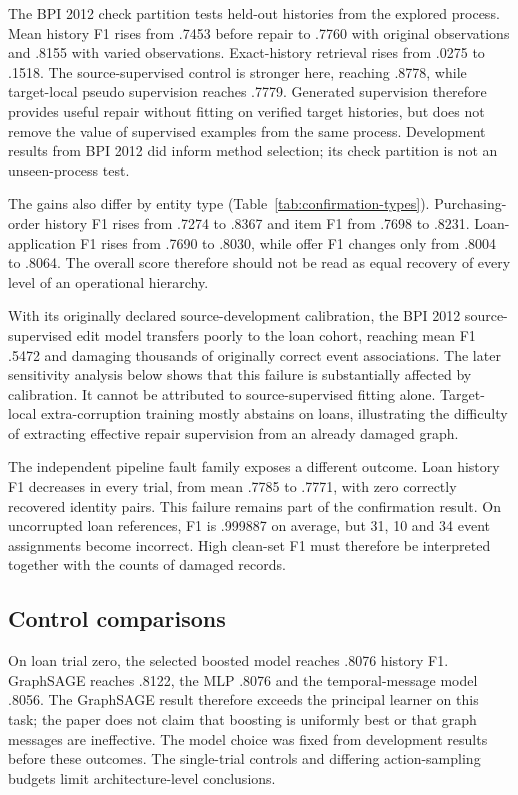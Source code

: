 \documentclass[11pt]{article}
\begin{document}
The BPI 2012 check partition tests held-out histories from the explored process. Mean history F1 rises from .7453 before repair to .7760 with original observations and .8155 with varied observations. Exact-history retrieval rises from .0275 to .1518. The source-supervised control is stronger here, reaching .8778, while target-local pseudo supervision reaches .7779. Generated supervision therefore provides useful repair without fitting on verified target histories, but does not remove the value of supervised examples from the same process. Development results from BPI 2012 did inform method selection; its check partition is not an unseen-process test.

The gains also differ by entity type (Table~\ref{tab:confirmation-types}). Purchasing-order history F1 rises from .7274 to .8367 and item F1 from .7698 to .8231. Loan-application F1 rises from .7690 to .8030, while offer F1 changes only from .8004 to .8064. The overall score therefore should not be read as equal recovery of every level of an operational hierarchy.

With its originally declared source-development calibration, the BPI 2012 source-supervised edit model transfers poorly to the loan cohort, reaching mean F1 .5472 and damaging thousands of originally correct event associations. The later sensitivity analysis below shows that this failure is substantially affected by calibration. It cannot be attributed to source-supervised fitting alone. Target-local extra-corruption training mostly abstains on loans, illustrating the difficulty of extracting effective repair supervision from an already damaged graph.

The independent pipeline fault family exposes a different outcome. Loan history F1 decreases in every trial, from mean .7785 to .7771, with zero correctly recovered identity pairs. This failure remains part of the confirmation result. On uncorrupted loan references, F1 is .999887 on average, but 31, 10 and 34 event assignments become incorrect. High clean-set F1 must therefore be interpreted together with the counts of damaged records.


\subsection{Control comparisons}

On loan trial zero, the selected boosted model reaches .8076 history F1. GraphSAGE reaches .8122, the MLP .8076 and the temporal-message model .8056. The GraphSAGE result therefore exceeds the principal learner on this task; the paper does not claim that boosting is uniformly best or that graph messages are ineffective. The model choice was fixed from development results before these outcomes. The single-trial controls and differing action-sampling budgets limit architecture-level conclusions.
\end{document}
